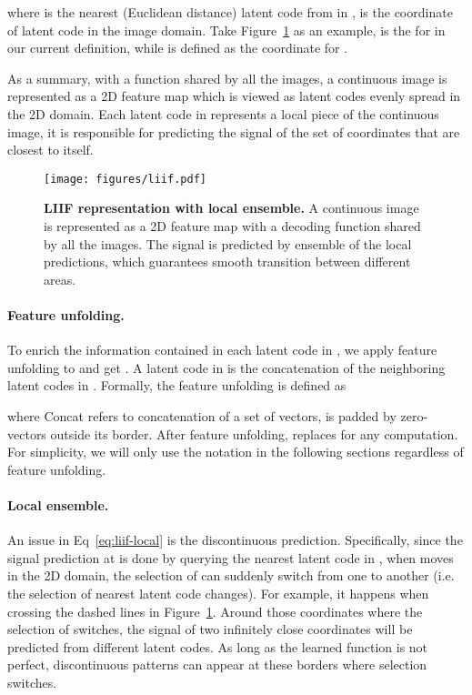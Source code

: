 \documentclass[final]{cvpr}
\begin{document}
where  is the nearest (Euclidean distance) latent code from  in ,   is the coordinate of latent code  in the image domain. Take Figure~\ref{fig:liif} as an example,  is the  for  in our current definition, while  is defined as the coordinate for .

As a summary, with a function  shared by all the images, a continuous image is represented as a 2D feature map  which is viewed as  latent codes evenly spread in the 2D domain. Each latent code  in  represents a local piece of the continuous image, it is responsible for predicting the signal of the set of coordinates that are closest to itself.

\begin{figure}
    \centering
    \texttt{[image: figures/liif.pdf]}
    \caption{\textbf{LIIF representation with local ensemble.} A continuous image is represented as a 2D feature map with a decoding function  shared by all the images. The signal is predicted by ensemble of the local predictions, which guarantees smooth transition between different areas.}
    \label{fig:liif}
\end{figure}

\vspace{-1em}
\paragraph{Feature unfolding.} To enrich the information contained in each latent code in , we apply feature unfolding to  and get . A latent code in  is the concatenation of the  neighboring latent codes in . Formally, the feature unfolding is defined as

where Concat refers to concatenation of a set of vectors,  is padded by zero-vectors outside its border. After feature unfolding,  replaces  for any computation. For simplicity, we will only use the notation  in the following sections regardless of feature unfolding. 

\vspace{-1em}
\paragraph{Local ensemble.} An issue in Eq~\ref{eq:liif-local} is the discontinuous prediction. Specifically, since the signal prediction at  is done by querying the nearest latent code  in , when  moves in the 2D domain, the selection of  can suddenly switch from one to another (i.e. the selection of nearest latent code changes). For example, it happens when  crossing the dashed lines in Figure~\ref{fig:liif}. Around those coordinates where the selection of  switches, the signal of two infinitely close coordinates will be predicted from different latent codes. As long as the learned function  is not perfect, discontinuous patterns can appear at these borders where  selection switches.
\end{document}
